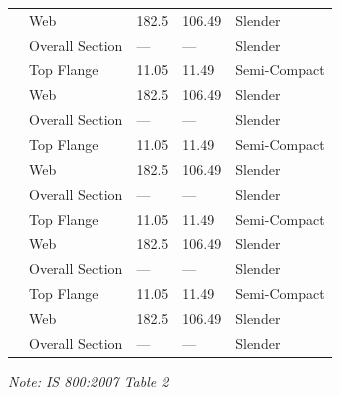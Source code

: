 \documentclass[12pt,a4paper]{report}
\numberwithin{table}{chapter}
\numberwithin{figure}{chapter}
\newcommand{\ReportTableRowGap}{6pt}
\begin{document}
\begin{longtable}{|C{2.5cm}|L{3cm}|C{3.5cm}|C{2.5cm}|>{\centering\arraybackslash}p{4.0cm}|}
 & Web & 182.5 & 106.49 & Slender \\[\ReportTableRowGap]
 & Overall Section & --- & --- & Slender \\[\ReportTableRowGap]
\hline
{} & Top Flange & 11.05 & 11.49 & Semi-Compact \\[\ReportTableRowGap]
 & Web & 182.5 & 106.49 & Slender \\[\ReportTableRowGap]
 & Overall Section & --- & --- & Slender \\[\ReportTableRowGap]
\hline
{} & Top Flange & 11.05 & 11.49 & Semi-Compact \\[\ReportTableRowGap]
 & Web & 182.5 & 106.49 & Slender \\[\ReportTableRowGap]
 & Overall Section & --- & --- & Slender \\[\ReportTableRowGap]
\hline
{} & Top Flange & 11.05 & 11.49 & Semi-Compact \\[\ReportTableRowGap]
 & Web & 182.5 & 106.49 & Slender \\[\ReportTableRowGap]
 & Overall Section & --- & --- & Slender \\[\ReportTableRowGap]
\hline
{} & Top Flange & 11.05 & 11.49 & Semi-Compact \\[\ReportTableRowGap]
 & Web & 182.5 & 106.49 & Slender \\[\ReportTableRowGap]
 & Overall Section & --- & --- & Slender \\[\ReportTableRowGap]
\hline
\end{longtable}
\noindent\textit{Note: IS 800:2007 Table 2}
\end{document}

